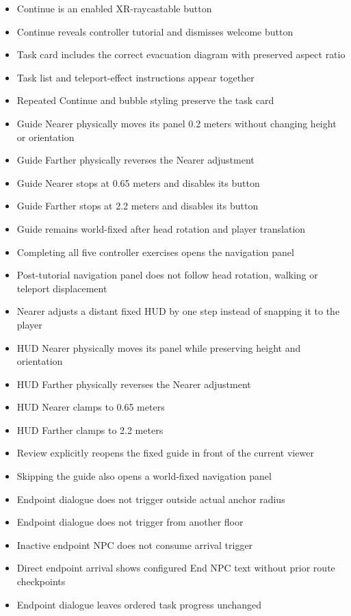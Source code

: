 \documentclass[12pt,a4paper]{article}
\begin{document}
\begin{itemize}[leftmargin=*,nosep]
\item Continue is an enabled XR-raycastable button
\item Continue reveals controller tutorial and dismisses welcome button
\item Task card includes the correct evacuation diagram with preserved aspect ratio
\item Task list and teleport-effect instructions appear together
\item Repeated Continue and bubble styling preserve the task card
\item Guide Nearer physically moves its panel 0.2 meters without changing height or orientation
\item Guide Farther physically reverses the Nearer adjustment
\item Guide Nearer stops at 0.65 meters and disables its button
\item Guide Farther stops at 2.2 meters and disables its button
\item Guide remains world-fixed after head rotation and player translation
\item Completing all five controller exercises opens the navigation panel
\item Post-tutorial navigation panel does not follow head rotation, walking or teleport displacement
\item Nearer adjusts a distant fixed HUD by one step instead of snapping it to the player
\item HUD Nearer physically moves its panel while preserving height and orientation
\item HUD Farther physically reverses the Nearer adjustment
\item HUD Nearer clamps to 0.65 meters
\item HUD Farther clamps to 2.2 meters
\item Review explicitly reopens the fixed guide in front of the current viewer
\item Skipping the guide also opens a world-fixed navigation panel
\item Endpoint dialogue does not trigger outside actual anchor radius
\item Endpoint dialogue does not trigger from another floor
\item Inactive endpoint NPC does not consume arrival trigger
\item Direct endpoint arrival shows configured End NPC text without prior route checkpoints
\item Endpoint dialogue leaves ordered task progress unchanged

\end{itemize}
\end{document}
